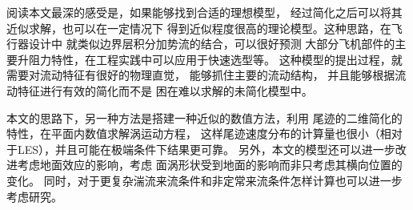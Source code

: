 \documentclass[UTF8,zihao=5]{ctexart} %
\begin{document}
阅读本文最深的感受是，如果能够找到合适的理想模型，
经过简化之后可以将其近似求解，也可以在一定情况下
得到近似程度很高的理论模型。这种思路，在飞行器设计中
就类似边界层积分加势流的结合，可以很好预测
大部分飞机部件的主要升阻力特性，在工程实践中可以应用于快速选型等。
这种模型的提出过程，就需要对流动特征有很好的物理直觉，
能够抓住主要的流动结构，
并且能够根据流动特征进行有效的简化而不是
困在难以求解的未简化模型中。

本文的思路下，另一种方法是搭建一种近似的数值方法，利用
尾迹的二维简化的特性，在平面内数值求解涡运动方程，
这样尾迹速度分布的计算量也很小（相对于LES），并且可能在极端条件下结果更可靠。
另外，本文的模型还可以进一步改进考虑地面效应的影响，考虑
面涡形状受到地面的影响而非只考虑其横向位置的变化。
同时，对于更复杂湍流来流条件和非定常来流条件怎样计算也可以进一步考虑研究。


{}





































\end{document}
